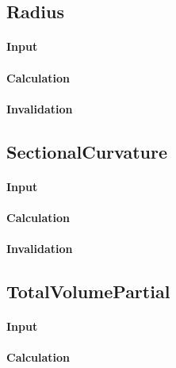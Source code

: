 \bigskip

\subsection{Radius}

\paragraph{Input}

\paragraph{Calculation}

\paragraph{Invalidation}

\bigskip

\subsection{SectionalCurvature}

\paragraph{Input}

\paragraph{Calculation}

\paragraph{Invalidation}

\bigskip

\subsection{TotalVolumePartial}

\paragraph{Input}

\paragraph{Calculation}

